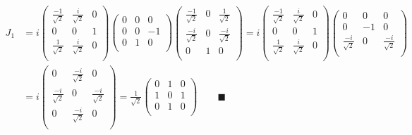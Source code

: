 \documentclass{article}
\begin{document}
\begin{align*}
  J_1 & =i\begin{pmatrix}
    \frac{-1}{\sqrt{2}} & \frac{i}{\sqrt{2}} & 0 \\
    0                   & 0                  & 1 \\
    \frac{1}{\sqrt{2}}  & \frac{i}{\sqrt{2}} & 0 \\
  \end{pmatrix}\begin{pmatrix}
    0 & 0 & 0  \\
    0 & 0 & -1 \\
    0 & 1 & 0  \\
  \end{pmatrix}\begin{pmatrix}
    \frac{-1}{\sqrt{2}} & 0 & \frac{1}{\sqrt{2}}  \\
    \frac{-i}{\sqrt{2}} & 0 & \frac{-i}{\sqrt{2}} \\
    0                   & 1 & 0                   \\
  \end{pmatrix}=i\begin{pmatrix}
    \frac{-1}{\sqrt{2}} & \frac{i}{\sqrt{2}} & 0 \\
    0                   & 0                  & 1 \\
    \frac{1}{\sqrt{2}}  & \frac{i}{\sqrt{2}} & 0 \\
  \end{pmatrix}\begin{pmatrix}
    0                   & 0  & 0                   \\
    0                   & -1 & 0                   \\
    \frac{-i}{\sqrt{2}} & 0  & \frac{-i}{\sqrt{2}} \\
  \end{pmatrix} \\
      & =i\begin{pmatrix}
    0                   & \frac{-i}{\sqrt{2}} & 0                   \\
    \frac{-i}{\sqrt{2}} & 0                   & \frac{-i}{\sqrt{2}} \\
    0                   & \frac{-i}{\sqrt{2}} & 0                   \\
  \end{pmatrix}=\frac{1}{\sqrt{2}}\begin{pmatrix}
    0 & 1 & 0 \\
    1 & 0 & 1 \\
    0 & 1 & 0 \\
  \end{pmatrix}\qquad\blacksquare
\end{align*}
\end{document}

